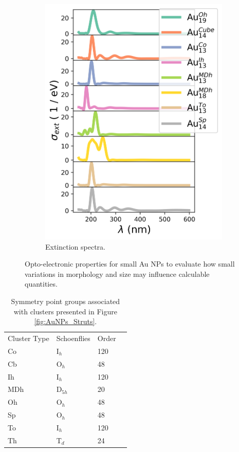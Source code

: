 \begin{figure}
\begin{subfigure}{0.335\textwidth}
        \includegraphics[width=\textwidth]{figures/LM/Atomistic/Au_NPs_CSV.png}
        \caption{Extinction spectra.}
        \label{fig:AuNPs_CSV}
    \end{subfigure}
    \caption{Opto-electronic properties for small Au NPs to evaluate how small variations in morphology and size may influence calculable quantities.}
    \label{fig:DFT_AuNPs}
\end{figure}

\begin{table}[ht]
\centering
\caption{Symmetry point groups associated with clusters presented in Figure \ref{fig:AuNPs_Struts}.}
\label{tab:symmetry_groups}
\begin{tabular}{@{}llll@{}}
\toprule
Cluster Type & Schoenflies &  Order \\
Co           & I$_{h}$              & 120 \\
Cb           & O$_{h}$              & 48  \\
Ih           & I$_{h}$              & 120 \\
MDh          & D$_{5h}$             & 20  \\
Oh           & O$_{h}$              & 48  \\
Sp           & O$_{h}$              & 48  \\
To           & I$_{h}$              & 120 \\
Th           & T$_{d}$              & 24  \\
\hline
\bottomrule
\end{tabular}
\end{table}

